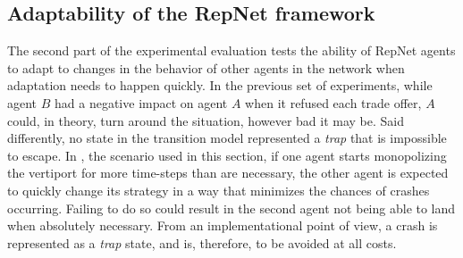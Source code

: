 \subsection{Adaptability of the RepNet framework}
\label{sub:adaptrep}


The second part of the experimental evaluation tests the ability of RepNet agents to adapt to changes in the behavior of other agents in the network when adaptation needs to happen quickly. In the previous set of experiments, while agent $B$ had a negative impact on agent $A$ when it refused each trade offer, $A$ could, in theory, turn around the situation, however bad it may be. Said differently, no state in the transition model represented a \textit{trap} that is impossible to escape. 
In , the scenario used in this section, if one agent starts monopolizing the vertiport for more time-steps than are necessary, the other agent is expected to quickly change its strategy in a way that minimizes the chances of crashes occurring. Failing to do so could result in the second agent not being able to land when absolutely necessary. From an implementational point of view, a crash is represented as a \textit{trap} state, and is, therefore, to be avoided at all costs.


